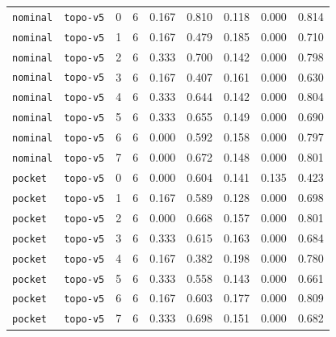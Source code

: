 \documentclass{article}
\begin{document}
\begin{center}
\begin{tabular}{lllcccccc}
\texttt{nominal} & \texttt{topo-v5} & 0 & 6 & 0.167 & 0.810 & 0.118 & 0.000 & 0.814 \\
\texttt{nominal} & \texttt{topo-v5} & 1 & 6 & 0.167 & 0.479 & 0.185 & 0.000 & 0.710 \\
\texttt{nominal} & \texttt{topo-v5} & 2 & 6 & 0.333 & 0.700 & 0.142 & 0.000 & 0.798 \\
\texttt{nominal} & \texttt{topo-v5} & 3 & 6 & 0.167 & 0.407 & 0.161 & 0.000 & 0.630 \\
\texttt{nominal} & \texttt{topo-v5} & 4 & 6 & 0.333 & 0.644 & 0.142 & 0.000 & 0.804 \\
\texttt{nominal} & \texttt{topo-v5} & 5 & 6 & 0.333 & 0.655 & 0.149 & 0.000 & 0.690 \\
\texttt{nominal} & \texttt{topo-v5} & 6 & 6 & 0.000 & 0.592 & 0.158 & 0.000 & 0.797 \\
\texttt{nominal} & \texttt{topo-v5} & 7 & 6 & 0.000 & 0.672 & 0.148 & 0.000 & 0.801 \\
\texttt{pocket} & \texttt{topo-v5} & 0 & 6 & 0.000 & 0.604 & 0.141 & 0.135 & 0.423 \\
\texttt{pocket} & \texttt{topo-v5} & 1 & 6 & 0.167 & 0.589 & 0.128 & 0.000 & 0.698 \\
\texttt{pocket} & \texttt{topo-v5} & 2 & 6 & 0.000 & 0.668 & 0.157 & 0.000 & 0.801 \\
\texttt{pocket} & \texttt{topo-v5} & 3 & 6 & 0.333 & 0.615 & 0.163 & 0.000 & 0.684 \\
\texttt{pocket} & \texttt{topo-v5} & 4 & 6 & 0.167 & 0.382 & 0.198 & 0.000 & 0.780 \\
\texttt{pocket} & \texttt{topo-v5} & 5 & 6 & 0.333 & 0.558 & 0.143 & 0.000 & 0.661 \\
\texttt{pocket} & \texttt{topo-v5} & 6 & 6 & 0.167 & 0.603 & 0.177 & 0.000 & 0.809 \\
\texttt{pocket} & \texttt{topo-v5} & 7 & 6 & 0.333 & 0.698 & 0.151 & 0.000 & 0.682 \\
\bottomrule
\end{tabular}
\end{center}
\normalsize



\end{document}
